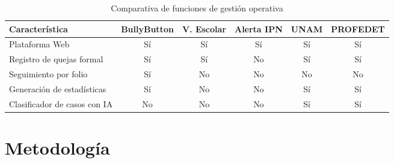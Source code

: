             \begin{table}[h]
            \centering
            \caption{Comparativa de funciones de gestión operativa}
            \label{tab:comparativa}
            \begin{tabular}{|p{2.5cm}|c|c|c|c|c|}
                \hline
                \textbf{Característica} & \textbf{BullyButton} & \textbf{V. Escolar} & \textbf{Alerta IPN} & \textbf{UNAM} & \textbf{PROFEDET} \\
                \hline
                Plataforma Web & Sí & Sí & Sí & Sí & Sí \\
                \hline
                Registro de quejas formal & Sí & Sí & No & Sí & Sí \\
                \hline
                Seguimiento por folio & Sí & No & No & No & No \\
                \hline
                Generación de estadísticas & Sí & No & No & Sí & Sí \\
                \hline
                Clasificador de casos con IA & No & No & No & Sí & Sí \\
                \hline
            \end{tabular}
            \end{table}
    
    \section{Metodología}
    
